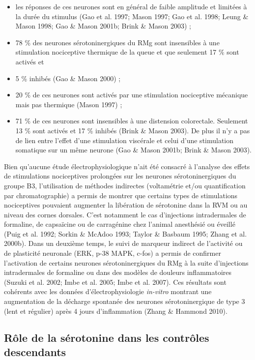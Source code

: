 \documentclass[a4paper,12pt,twoside]{report}
\begin{document}
\begin{itemize}
\item les réponses de ces neurones sont en général de faible amplitude et limitées à la durée du stimulus (Gao et al. 1997; Mason 1997; Gao et al. 1998; Leung \& Mason 1998; Gao \& Mason 2001b; Brink \& Mason 2003) ;
\item 78 \% des neurones sérotoninergiques du RMg sont insensibles à une stimulation nociceptive thermique de la queue et que seulement 17 \% sont activés et \item 5 \% inhibés (Gao \& Mason 2000) ;
\item 20 \% de ces neurones sont activés par une stimulation nociceptive mécanique mais pas thermique (Mason 1997) ;
\item 71 \% de ces neurones sont insensibles à une distension colorectale. Seulement 13 \% sont activés et 17 \% inhibés (Brink \& Mason 2003). De plus il n’y a pas de lien entre l’effet d’une stimulation viscérale et celui d’une stimulation somatique sur un même neurone (Gao \& Mason 2001b; Brink \& Mason 2003).
\end{itemize}

Bien qu’aucune étude électrophysiologique n’ait été consacré à l’analyse des effets de stimulations nociceptives prolongées sur les neurones sérotoninergiques du groupe B3, l’utilisation de méthodes indirectes (voltamétrie et/ou quantification par chromatographie) a permis de montrer que certains types de stimulations nociceptives pouvaient augmenter la libération de sérotonine dans la RVM ou au niveau des cornes dorsales. C’est notamment le cas d’injections intradermales de formaline, de capsaïcine ou de carragénine chez l’animal anesthésié ou éveillé (Puig et al. 1992; Sorkin \& McAdoo 1993; Taylor \& Basbaum 1995; Zhang et al. 2000b). Dans un deuxième temps, le suivi de marqueur indirect de l’activité ou de plasticité neuronale (ERK, p-38 MAPK, c-fos) a permis de confirmer l’activation de certains neurones sérotoninergiques du RMg à la suite d’injections intradermales de formaline ou dans des modèles de douleurs inflammatoires (Suzuki et al. 2002; Imbe et al. 2005; Imbe et al. 2007). Ces résultats sont cohérents avec les données d’électrophysiologie \textit{in-vitro} montrant une augmentation de la décharge spontanée des neurones sérotoninergique de type 3 (lent et régulier) après 4 jours d’inflammation (Zhang \& Hammond 2010). 

\subsection{Rôle de la sérotonine dans les contrôles descendants }
\label{5-HT dans contrôle descendants}
\end{document}
